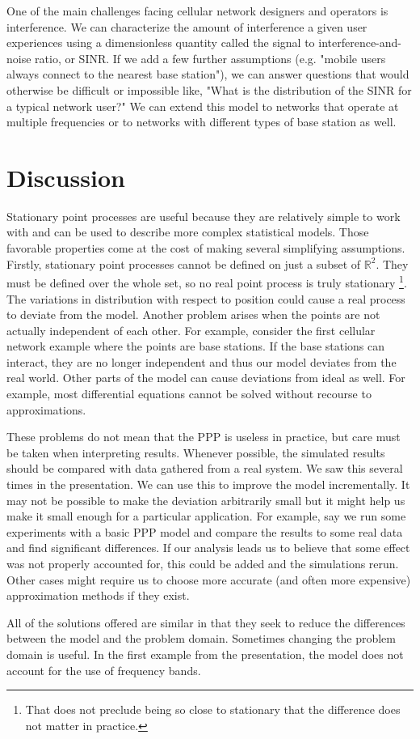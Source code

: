 \documentclass[]{article}
\begin{document}
One of the main challenges facing cellular network designers and operators is interference. We can characterize the amount of interference a given user experiences using a dimensionless quantity called the signal to interference-and-noise ratio, or SINR. If we add a few further assumptions (e.g. "mobile users always connect to the nearest base station"), we can answer questions that would otherwise be difficult or impossible like, "What is the distribution of the SINR for a typical network user?" We can extend this model to networks that operate at multiple frequencies or to networks with different types of base station as well.

\section{Discussion}
Stationary point processes are useful because they are relatively simple to work with and can be used to describe more complex statistical models. Those favorable properties come at the cost of making several simplifying assumptions. Firstly, stationary point processes cannot be defined on just a subset of $\mathbb{R}^2$. They must be defined over the whole set, so no real point process is truly stationary \footnote{That does not preclude being so close to stationary that the difference does not matter in practice.}. The variations in distribution with respect to position could cause a real process to deviate from the model. Another problem arises when the points are not actually independent of each other. For example, consider the first cellular network example where the points are base stations. If the base stations can interact, they are no longer independent and thus our model deviates from the real world. Other parts of the model can cause deviations from ideal as well. For example, most differential equations cannot be solved without recourse to approximations.

These problems do not mean that the PPP is useless in practice, but care must be taken when interpreting results. Whenever possible, the simulated results should be compared with data gathered from a real system. We saw this several times in the presentation. We can use this to improve the model incrementally. It may not be possible to make the deviation arbitrarily small but it might help us make it small enough for a particular application. For example, say we run some experiments with a basic PPP model and compare the results to some real data and find significant differences. If our analysis leads us to believe that some effect was not properly accounted for, this could be added and the simulations rerun. Other cases might require us to choose more accurate (and often more expensive) approximation methods if they exist.

All of the solutions offered are similar in that they seek to reduce the differences between the model and the problem domain. Sometimes changing the problem domain is useful. In the first example from the presentation, the model does not account for the use of frequency bands. 
\nocite{kham}
\nocite{randv}
\nocite{ppp}
\nocite{poissond}


\end{document}
